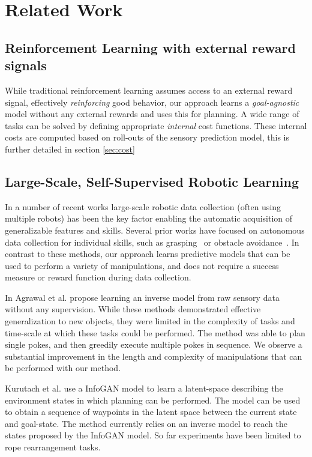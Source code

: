 \section{Related Work}\label{sec:rel_work}

\subsection{Reinforcement Learning with external reward signals}
While traditional reinforcement learning assumes access to an external reward signal, effectively \emph{reinforcing} good behavior, our approach learns a \emph{goal-agnostic} model without any external rewards and uses this for planning. 
A wide range of tasks can be solved by defining appropriate \emph{internal} cost functions. These internal costs are computed based on roll-outs of the sensory prediction model, this is further detailed in section \ref{sec:cost}

\subsection{Large-Scale, Self-Supervised Robotic Learning}

In a number of recent works large-scale robotic data collection (often using multiple robots) has been the key factor enabling the automatic acquisition of generalizable features and skills. Several prior works have focused on autonomous data collection for individual skills, such as grasping~\cite{lerrel,google_handeye} or obstacle avoidance~\cite{greg_kahn_uncertainty,crashing}. In contrast to these methods, our approach learns predictive models that can be used to perform a variety of manipulations, and does not require a success measure or reward function during data collection. 

In \cite{pulkit} Agrawal et al. propose learning an inverse model from raw sensory data without any supervision. While these methods demonstrated effective generalization to new objects, they were limited in the complexity of tasks and time-scale at which these tasks could be performed. The method was able to plan single pokes, and then greedily execute multiple pokes in sequence. We observe a substantial improvement in the length and complexity of manipulations that can be performed with our method.

Kurutach et al. use a InfoGAN model \cite{kurutach2018learning} to learn a latent-space describing the environment states in which planning can be performed. The model can be used to obtain a sequence of waypoints in the latent space between the current state and goal-state. The method currently relies on an inverse model to reach the states proposed by the InfoGAN model. So far experiments have been limited to rope rearrangement tasks.


